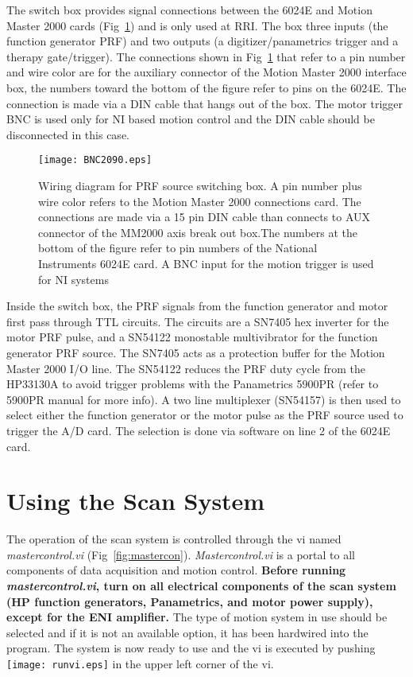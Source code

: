\documentclass[10pt]{article}
\begin{document}
The switch box provides signal connections between the 6024E and
Motion Master 2000 cards (Fig~\ref{fig:BNC2090}) and is only used
at RRI. The box three inputs (the function generator PRF) and two
outputs (a digitizer/panametrics trigger and a therapy
gate/trigger). The connections shown in Fig~\ref{fig:BNC2090} that
refer to a pin number and wire color are for the auxiliary
connector of the Motion Master 2000 interface box, the numbers
toward the bottom of the figure refer to pins on the 6024E. The
connection is made via a DIN cable that hangs out of the box. The
motor trigger BNC is used only for NI based motion control and the
DIN cable should be disconnected in this case.



\begin{figure}[htb]
\begin{center}
\texttt{[image: BNC2090.eps]}
 \caption{Wiring diagram for PRF source switching box. A pin
 number plus wire color refers to the Motion Master 2000 connections
 card. The connections are made via a 15 pin DIN cable than connects to
 AUX connector of the MM2000 axis break out box.The numbers at the bottom
 of the figure refer to pin numbers of the National Instruments 6024E card.
 A BNC input for the motion trigger is used for NI systems}
 \label{fig:BNC2090}
\end{center}
\end{figure}

Inside the switch box, the PRF signals from the function generator
and motor first pass through TTL circuits. The circuits are a
SN7405 hex inverter for the motor PRF pulse, and a SN54122
monostable multivibrator for the function generator PRF source.
The SN7405 acts as a protection buffer for the Motion Master 2000
I/O line. The SN54122 reduces the PRF duty cycle from the HP33130A
to avoid trigger problems with the Panametrics 5900PR (refer to
5900PR manual for more info). A two line multiplexer (SN54157) is
then used to select either the function generator or the motor
pulse as the PRF source used to trigger the A/D card. The
selection is done via software on line 2 of the 6024E card.

\section{Using the Scan System}

The operation of the scan system is controlled through the vi
named {\it mastercontrol.vi} (Fig~\ref{fig:mastercon}). {\it
Mastercontrol.vi} is a portal to all components of data
acquisition and motion control. {\bf Before running {\it
mastercontrol.vi}, turn on all electrical components of the scan
system (HP function generators, Panametrics, and motor power
supply), except for the ENI amplifier.} The type of motion system
in use should be selected and if it is not an available option, it
has been hardwired into the program. The system is now ready to
use and the vi is executed by pushing
\texttt{[image: runvi.eps]} in the upper left corner of the vi.
\end{document}
